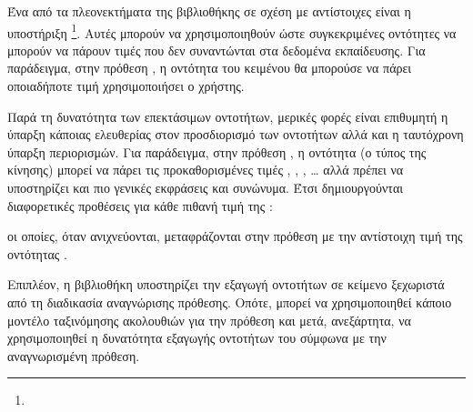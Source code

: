 Ένα από τα πλεονεκτήματα της βιβλιοθήκης σε σχέση με αντίστοιχες είναι η υποστήριξη \footnote{%
}.
Αυτές μπορούν να χρησιμοποιηθούν ώστε συγκεκριμένες οντότητες να μπορούν να πάρουν τιμές που δεν συναντώνται στα δεδομένα εκπαίδευσης.
Για παράδειγμα, στην πρόθεση , η οντότητα του κειμένου  θα μπορούσε να πάρει οποιαδήποτε τιμή χρησιμοποιήσει ο χρήστης.

Παρά τη δυνατότητα των επεκτάσιμων οντοτήτων, μερικές φορές είναι επιθυμητή η ύπαρξη κάποιας ελευθερίας στον προσδιορισμό των οντοτήτων αλλά και η ταυτόχρονη ύπαρξη περιορισμών.
Για παράδειγμα, στην πρόθεση , η οντότητα  (ο τύπος της κίνησης) μπορεί να πάρει τις προκαθορισμένες τιμές , , , \ldots{} αλλά πρέπει να υποστηρίζει και πιο γενικές εκφράσεις και συνώνυμα.
Έτσι δημιουργούνται διαφορετικές προθέσεις για κάθε πιθανή τιμή της :
\begin{compactenum}
    \item {}
    \item {}
    \item {}
    \item {}
    \item {}
    \item {}
\end{compactenum}
οι οποίες, όταν ανιχνεύονται, μεταφράζονται στην πρόθεση  με την αντίστοιχη τιμή της οντότητας .

Επιπλέον, η βιβλιοθήκη υποστηρίζει την εξαγωγή οντοτήτων σε κείμενο ξεχωριστά από τη διαδικασία αναγνώρισης πρόθεσης.
Οπότε, μπορεί να χρησιμοποιηθεί κάποιο μοντέλο ταξινόμησης ακολουθιών για την πρόθεση και μετά, ανεξάρτητα, να χρησιμοποιηθεί η δυνατότητα εξαγωγής οντοτήτων του  σύμφωνα με την αναγνωρισμένη πρόθεση.

